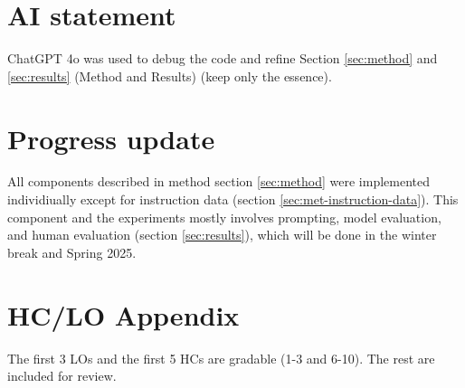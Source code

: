 \documentclass{article}
\begin{document}
\clearpage

\appendix

\section{AI statement}
\label{sec:ai}

ChatGPT 4o was used to debug the code and refine Section \ref{sec:method} and \ref{sec:results} (Method and Results) (keep only the essence).

\section{Progress update}
\label{sec:progress}

All components described in method section \ref{sec:method} were implemented individiually except for instruction data (section \ref{sec:met-instruction-data}). This component and the experiments mostly involves prompting, model evaluation, and human evaluation (section \ref{sec:results}), which will be done in the winter break and Spring 2025.

\section{HC/LO Appendix}
\label{sec:hclo}

The first 3 LOs and the first 5 HCs are gradable (1-3 and 6-10). The rest are included for review.
\end{document}
